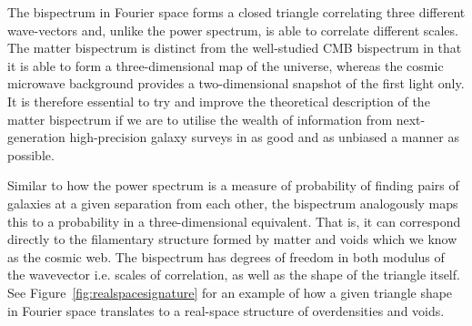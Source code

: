 The bispectrum in Fourier space forms a closed triangle correlating three different wave-vectors and, unlike the power spectrum, is able to correlate different scales. The matter bispectrum is distinct from the well-studied CMB bispectrum in that it is able to form a three-dimensional map of the universe, whereas the cosmic microwave background provides a two-dimensional snapshot of the first light only. It is therefore essential to try and improve the theoretical description of the matter bispectrum if we are to utilise the wealth of information from next-generation high-precision galaxy surveys in as good and as unbiased a manner as possible. 

Similar to how the power spectrum is a measure of probability of finding pairs of galaxies at a given separation from each other, the bispectrum analogously maps this to a probability in a three-dimensional equivalent. That is, it can correspond directly to the filamentary structure formed by matter and voids which we know as the cosmic web. The bispectrum has degrees of freedom in both modulus of the wavevector i.e. scales of correlation, as well as the shape of the triangle itself. See Figure~\ref{fig:realspacesignature} for an example of how a given triangle shape in Fourier space translates to a real-space structure of overdensities and voids. 

